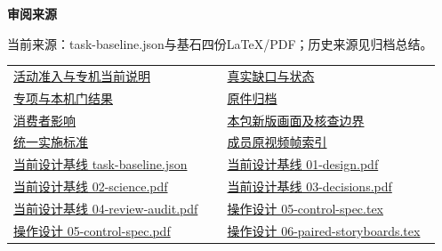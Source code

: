 \documentclass[11pt,a4paper]{article}
\newcommand{\reviewsubsection}[1]{\par\Needspace{4\baselineskip}\vspace{4pt}\begin{center}{\titlelatin\titlecjk\bfseries\fontsize{12}{18}\selectfont #1}\end{center}}
\begin{document}
\begin{minipage}{\linewidth}
\reviewsubsection{3.4 审阅来源}
当前来源：task-\allowbreak{}baseline.json与基石四份LaTeX/\allowbreak{}PDF；历史来源见归档总结。


\begingroup\small\setlength{\tabcolsep}{4pt}\begin{tabular}{@{}p{0.48\linewidth}p{0.48\linewidth}@{}}
\href{file:///D:/Agent/srp/agent/tasks/G-05/outputs/current-admission.md}{活动准入与专机当前说明} & \href{file:///D:/Agent/srp/agent/tasks/G-05/outputs/current-admission.json}{真实缺口与状态}\\[4pt]
\href{file:///D:/Agent/srp/agent/tasks/G-05/evidence/verification.json}{专项与本机门结果} & \href{file:///D:/Agent/srp/agent/tasks/G-05/archive/README.md}{原件归档}\\[4pt]
\href{file:///D:/Agent/srp/agent/tasks/G-05/evidence/consumer-impact.md}{消费者影响} & \href{file:///D:/Agent/srp/agent/tasks/G-05/outputs/current-implementation-evidence.md}{本包新版画面及核查边界}\\[4pt]
\href{file:///D:/Agent/srp/agent/design/weather/2026-10-08_Storm\%E4\%B8\%8E\%E7\%BA\%AF\%E7\%B2\%92\%E5\%AD\%90\%E5\%8F\%8C\%E7\%8E\%AF\%E5\%AE\%9E\%E6\%96\%BD\%E6\%A0\%87\%E5\%87\%86.md}{统一实施标准} & \href{file:///D:/Agent/srp/human/assets/previews/2026-10-08/member-storm-particle-rings/frame-index.json}{成员原视频帧索引}\\[4pt]
\href{file:///D:/Agent/srp/agent/design/design-foundation-20261008/task-baseline.json}{当前设计基线 task-\allowbreak{}baseline.json} & \href{file:///D:/Agent/srp/agent/design/design-foundation-20261008/01-design.pdf}{当前设计基线 01-\allowbreak{}design.pdf}\\[4pt]
\href{file:///D:/Agent/srp/agent/design/design-foundation-20261008/02-science.pdf}{当前设计基线 02-\allowbreak{}science.pdf} & \href{file:///D:/Agent/srp/agent/design/design-foundation-20261008/03-decisions.pdf}{当前设计基线 03-\allowbreak{}decisions.pdf}\\[4pt]
\href{file:///D:/Agent/srp/agent/design/design-foundation-20261008/04-review-audit.pdf}{当前设计基线 04-\allowbreak{}review-\allowbreak{}audit.pdf} & \href{file:///D:/Agent/srp/agent/design/design-foundation-20261008/05-control-spec.tex}{操作设计 05-\allowbreak{}control-\allowbreak{}spec.tex}\\[4pt]
\href{file:///D:/Agent/srp/agent/design/design-foundation-20261008/05-control-spec.pdf}{操作设计 05-\allowbreak{}control-\allowbreak{}spec.pdf} & \href{file:///D:/Agent/srp/agent/design/design-foundation-20261008/06-paired-storyboards.tex}{操作设计 06-\allowbreak{}paired-\allowbreak{}storyboards.tex}\\[4pt]

\end{tabular}
\end{minipage}
\end{document}
